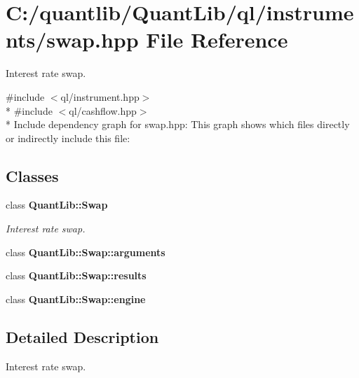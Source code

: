 \section{C\+:/quantlib/\+Quant\+Lib/ql/instruments/swap.hpp File Reference}
\label{swap_8hpp}


Interest rate swap.  


{\ttfamily \#include $<$ql/instrument.\+hpp$>$}\\*
{\ttfamily \#include $<$ql/cashflow.\+hpp$>$}\\*
Include dependency graph for swap.\+hpp\+:
This graph shows which files directly or indirectly include this file\+:
\subsection*{Classes}
\begin{DoxyCompactItemize}
\item 
class {\bf Quant\+Lib\+::\+Swap}
\begin{DoxyCompactList}\small\item\em Interest rate swap. \end{DoxyCompactList}\item 
class {\bf Quant\+Lib\+::\+Swap\+::arguments}
\item 
class {\bf Quant\+Lib\+::\+Swap\+::results}
\item 
class {\bf Quant\+Lib\+::\+Swap\+::engine}
\end{DoxyCompactItemize}


\subsection{Detailed Description}
Interest rate swap. 

